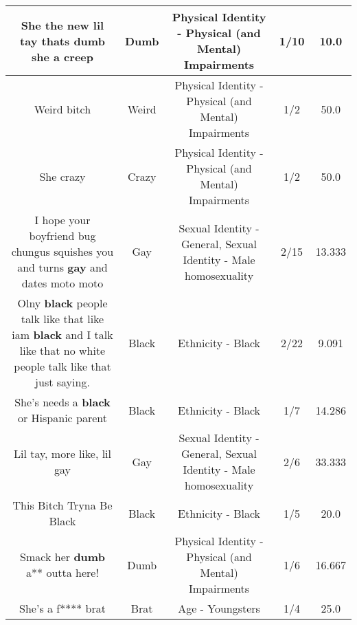 \documentclass[11pt]{article}
\newlength\mylength
\begin{document}
\begin{center}
\begin{longtable}{|C{.65\mylength}|C{.30\mylength}|C{.12\mylength}|C{.12\mylength}|C{.12\mylength}|}
  \small She the new lil tay thats \textbf{dumb} she a creep\normalsize   & Dumb & Physical Identity - Physical (and Mental) Impairments & 1/10 & 10.0 \\  \hline
  \small Weird bitch\normalsize   & Weird & Physical Identity - Physical (and Mental) Impairments & 1/2 & 50.0 \\  \hline
  \small She crazy\normalsize   & Crazy & Physical Identity - Physical (and Mental) Impairments & 1/2 & 50.0 \\  \hline
  \small I hope your boyfriend bug chungus squishes you and turns \textbf{g\textbf{ay}} and dates moto moto\normalsize   & Gay & Sexual Identity - General, Sexual Identity - Male homosexuality & 2/15 & 13.333 \\  \hline
  \small Olny \textbf{black} people talk like that like iam \textbf{black} and I talk like that no white people talk like that just saying.\normalsize   & Black & Ethnicity - Black & 2/22 & 9.091 \\  \hline
  \small She's needs  a \textbf{black} or Hispanic parent\normalsize   & Black & Ethnicity - Black & 1/7 & 14.286 \\  \hline
  \small Lil tay, more like, lil gay\normalsize   & Gay & Sexual Identity - General, Sexual Identity - Male homosexuality & 2/6 & 33.333 \\  \hline
  \small This Bitch Tryna Be Black\normalsize   & Black & Ethnicity - Black & 1/5 & 20.0 \\  \hline
  \small Smack her \textbf{dumb} a** outta here!\normalsize   & Dumb & Physical Identity - Physical (and Mental) Impairments & 1/6 & 16.667 \\  \hline
  \small She's a f**** brat\normalsize   & Brat & Age - Youngsters & 1/4 & 25.0 \\  \hline

\end{longtable}
\end{center}
\end{document}
